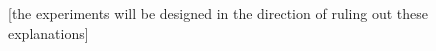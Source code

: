 \documentclass{article}
\begin{document}
[the experiments will be designed in the direction of ruling out these explanations]





%
%
%

%


\end{document}

